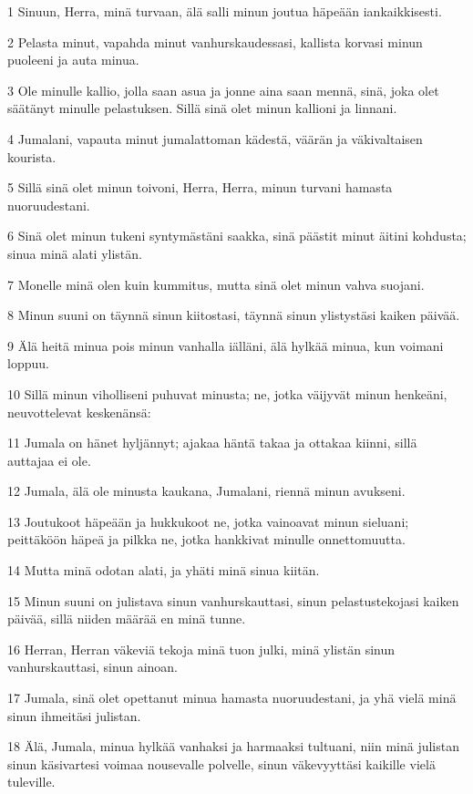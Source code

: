 \par 1 Sinuun, Herra, minä turvaan, älä salli minun joutua häpeään iankaikkisesti.
\par 2 Pelasta minut, vapahda minut vanhurskaudessasi, kallista korvasi minun puoleeni ja auta minua.
\par 3 Ole minulle kallio, jolla saan asua ja jonne aina saan mennä, sinä, joka olet säätänyt minulle pelastuksen. Sillä sinä olet minun kallioni ja linnani.
\par 4 Jumalani, vapauta minut jumalattoman kädestä, väärän ja väkivaltaisen kourista.
\par 5 Sillä sinä olet minun toivoni, Herra, Herra, minun turvani hamasta nuoruudestani.
\par 6 Sinä olet minun tukeni syntymästäni saakka, sinä päästit minut äitini kohdusta; sinua minä alati ylistän.
\par 7 Monelle minä olen kuin kummitus, mutta sinä olet minun vahva suojani.
\par 8 Minun suuni on täynnä sinun kiitostasi, täynnä sinun ylistystäsi kaiken päivää.
\par 9 Älä heitä minua pois minun vanhalla iälläni, älä hylkää minua, kun voimani loppuu.
\par 10 Sillä minun viholliseni puhuvat minusta; ne, jotka väijyvät minun henkeäni, neuvottelevat keskenänsä:
\par 11 Jumala on hänet hyljännyt; ajakaa häntä takaa ja ottakaa kiinni, sillä auttajaa ei ole.
\par 12 Jumala, älä ole minusta kaukana, Jumalani, riennä minun avukseni.
\par 13 Joutukoot häpeään ja hukkukoot ne, jotka vainoavat minun sieluani; peittäköön häpeä ja pilkka ne, jotka hankkivat minulle onnettomuutta.
\par 14 Mutta minä odotan alati, ja yhäti minä sinua kiitän.
\par 15 Minun suuni on julistava sinun vanhurskauttasi, sinun pelastustekojasi kaiken päivää, sillä niiden määrää en minä tunne.
\par 16 Herran, Herran väkeviä tekoja minä tuon julki, minä ylistän sinun vanhurskauttasi, sinun ainoan.
\par 17 Jumala, sinä olet opettanut minua hamasta nuoruudestani, ja yhä vielä minä sinun ihmeitäsi julistan.
\par 18 Älä, Jumala, minua hylkää vanhaksi ja harmaaksi tultuani, niin minä julistan sinun käsivartesi voimaa nousevalle polvelle, sinun väkevyyttäsi kaikille vielä tuleville.
